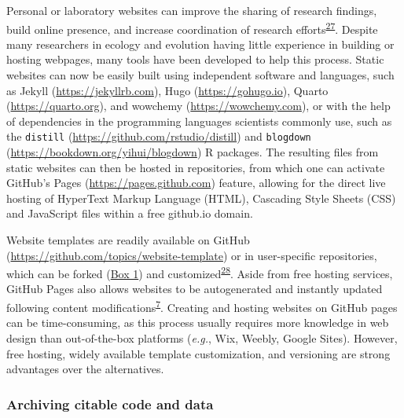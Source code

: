 Personal or laboratory websites can improve the sharing of research findings, build online presence, and increase coordination of research efforts\textsuperscript{\protect\hyperlink{ref-HiIPSSHV}{27}}.
Despite many researchers in ecology and evolution having little experience in building or hosting webpages, many tools have been developed to help this process.
Static websites can now be easily built using independent software and languages, such as Jekyll (\url{https://jekyllrb.com}), Hugo (\url{https://gohugo.io}), Quarto (\url{https://quarto.org}), and wowchemy (\url{https://wowchemy.com}), or with the help of dependencies in the programming languages scientists commonly use, such as the \texttt{distill} (\url{https://github.com/rstudio/distill}) and \texttt{blogdown} (\url{https://bookdown.org/yihui/blogdown}) R packages.
The resulting files from static websites can then be hosted in repositories, from which one can activate GitHub's Pages (\url{https://pages.github.com}) feature, allowing for the direct live hosting of HyperText Markup Language (HTML), Cascading Style Sheets (CSS) and JavaScript files within a free github.io domain.

Website templates are readily available on GitHub (\url{https://github.com/topics/website-template}) or in user-specific repositories, which can be forked (\protect\hyperlink{definitions}{Box 1}) and customized\textsuperscript{\protect\hyperlink{ref-MXxgZJ45}{28}}.
Aside from free hosting services, GitHub Pages also allows websites to be autogenerated and instantly updated following content modifications\textsuperscript{\protect\hyperlink{ref-RVetqmsg}{7}}.
Creating and hosting websites on GitHub pages can be time-consuming, as this process usually requires more knowledge in web design than out-of-the-box platforms (\emph{e.g.}, Wix, Weebly, Google Sites).
However, free hosting, widely available template customization, and versioning are strong advantages over the alternatives.

\hypertarget{archiving-citable-code-and-data}{%
\subsubsection{Archiving citable code and data}\label{archiving-citable-code-and-data}}

